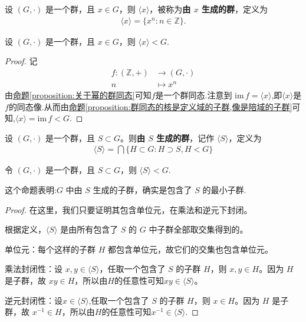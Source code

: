 \documentclass[../../main.tex]{subfiles}
\begin{document}
\begin{definition}[由 $x$ 生成的群]
设 $(G,\cdot)$ 是一个群，且 $x\in G$，则 $\langle x\rangle$，被称为\textbf{由 $x$ 生成的群}，定义为
\begin{align*}
\langle x\rangle=\{x^n:n\in\mathbb{Z}\}.
\end{align*} 
\end{definition}

\begin{proposition}\label{proposition:<x>是一个子群}
设 $(G,\cdot)$ 是一个群，且 $x\in G$，则 $\langle x\rangle<G$.
\end{proposition}
\begin{proof}
记
\begin{align*}
f:(\mathbb{Z} ,+)&\rightarrow (G,\cdot )
\\
n&\mapsto x^n
\end{align*}
由\hyperref[proposition:关于幂的群同态]{命题\ref{proposition:关于幂的群同态}}可知$f$是一个群同态.注意到 $\mathrm{im}\,f=\langle x\rangle$,即$\langle x \rangle$是$f$的同态像.从而由\hyperref[proposition:群同态的核是定义域的子群,像是陪域的子群]{命题\ref{proposition:群同态的核是定义域的子群,像是陪域的子群}}可知,$\langle x\rangle=\mathrm{im}\,f<G$.

\end{proof}

\begin{definition}[由 $S$ 生成的群]
设 $(G,\cdot)$ 是一个群，且 $S\subset G$。则\textbf{由 $S$ 生成的群}，记作 $\langle S\rangle$，定义为
\begin{align*}
\langle S\rangle=\bigcap\{H\subset G:H\supset S, H < G\}
\end{align*}
\end{definition}

\begin{proposition}
令 $(G,\cdot)$ 是一个群，且 $S\subset G$，则 $\langle S\rangle < G$.
\end{proposition}
\begin{note}
这个命题表明:$G$ 中由 $S$ 生成的子群，确实是包含了 $S$ 的最小子群.
\end{note}
\begin{proof}
在这里，我们只要证明其包含单位元，在乘法和逆元下封闭。

根据定义，$\langle S\rangle$ 是由所有包含了 $S$ 的 $G$ 中子群全部取交集得到的。

单位元：每个这样的子群 $H$ 都包含单位元，故它们的交集也包含单位元。

乘法封闭性：设 $x,y\in\langle S\rangle$，任取一个包含了 $S$ 的子群 $H$，则 $x,y\in H$。因为 $H$ 是子群，故 $xy\in H$，所以由$H$的任意性可知$xy\in\langle S\rangle$。

逆元封闭性：设$x\in \langle S\rangle$,任取一个包含了 $S$ 的子群 $H$，则 $x\in H$。因为 $H$ 是子群，故 $x^{-1}\in H$，所以由$H$的任意性可知$x^{-1}\in\langle S\rangle$.

\end{proof}
\end{document}
